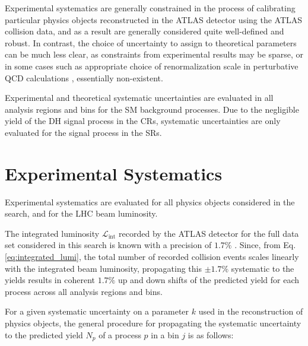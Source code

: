 Experimental systematics are generally constrained in the process of calibrating particular physics objects reconstructed in the ATLAS detector using the ATLAS collision data, and as a result are generally considered quite well-defined and robust. In contrast, the choice of uncertainty to assign to theoretical parameters can be much less clear, as constraints from experimental results may be sparse, or in some cases such as appropriate choice of renormalization scale in perturbative QCD calculations \cite{pdg_2020}, essentially non-existent. 

Experimental and theoretical systematic uncertainties are evaluated in all analysis regions and bins for the SM background processes. Due to the negligible yield of the DH signal process in the CRs, systematic uncertainties are only evaluated for the signal process in the SRs.

\section{Experimental Systematics}

Experimental systematics are evaluated for all physics objects considered in the search, and for the LHC beam luminosity. 

The integrated luminosity \(\mathcal{L}_\text{int}\) recorded by the ATLAS detector for the full data set considered in this search is known with a precision of \(1.7\%\) \cite{ATLAS-CONF-2019-021}. Since, from Eq. \ref{eq:integrated_lumi}, the total number of recorded collision events scales linearly with the integrated beam luminosity, propagating this \(\pm1.7\%\) systematic to the yields results in coherent \(1.7\%\) up and down shifts of the predicted yield for each process across all analysis regions and bins.

For a given systematic uncertainty on a parameter \(k\) used in the reconstruction of physics objects, the general procedure for propagating the systematic uncertainty to the predicted yield \(N_p\) of a process \(p\) in a bin \(j\) is as follows:


